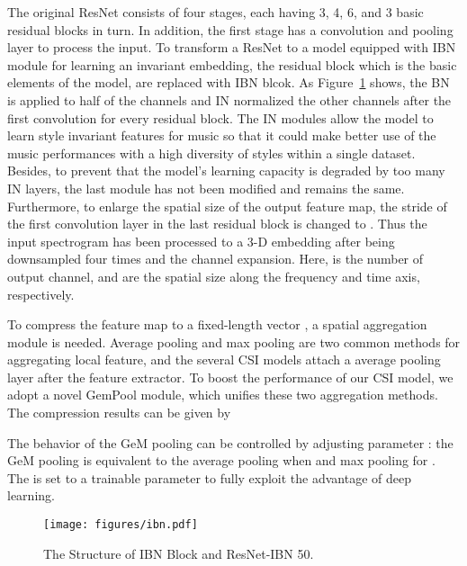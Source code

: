 \documentclass{article}
\newcommand{\figref}[1]{\mbox{Figure~\ref{#1}}}
\begin{document}
The original ResNet \cite{he2016deep} consists of four stages, each having 3, 4, 6, and 3 basic residual blocks in turn. In addition, the first stage has a  convolution and  pooling layer to process the input. To transform a ResNet to a model equipped with IBN module for learning an invariant embedding, the residual block which is the basic elements of the model, are replaced with IBN blcok. As \figref{fig:ibn} shows, the BN is applied to half of the channels and IN normalized the other channels after the first convolution for every residual block.  The IN modules allow the model to learn style invariant features for music so that it could make better use of the music performances with a high diversity of styles within a single dataset. Besides, to prevent that the model's learning capacity is degraded by too many IN layers, the last module has not been modified and remains the same. Furthermore, to enlarge the spatial size of the output feature map, the stride of the first convolution layer in the last residual block is changed to . Thus the input spectrogram has been processed to a 3-D embedding   after being downsampled four times and the channel expansion.  Here,  is the number of output channel,  and  are the spatial size along the frequency and time axis, respectively. \par

To compress the feature map  to a fixed-length vector , a spatial aggregation module is needed. Average pooling and max pooling are two common methods for aggregating local feature, and the several CSI models \cite{yu2019temporal,yu2020learning} attach a average pooling layer after the feature extractor. To boost the performance of our CSI model, we adopt a novel GemPool module, which unifies these two aggregation methods. The compression results  can be given by 
\vspace{-0.6em}

The behavior of the GeM pooling can be controlled by adjusting parameter  : the GeM pooling is equivalent to the average pooling when  and max pooling for . The  is set to a trainable parameter to fully exploit the advantage of deep learning. 





 \begin{figure}
	\centering
	\texttt{[image: figures/ibn.pdf]}
\caption{The Structure of IBN Block and ResNet-IBN 50.}


	\label{fig:ibn}
\end{figure}
\end{document}
